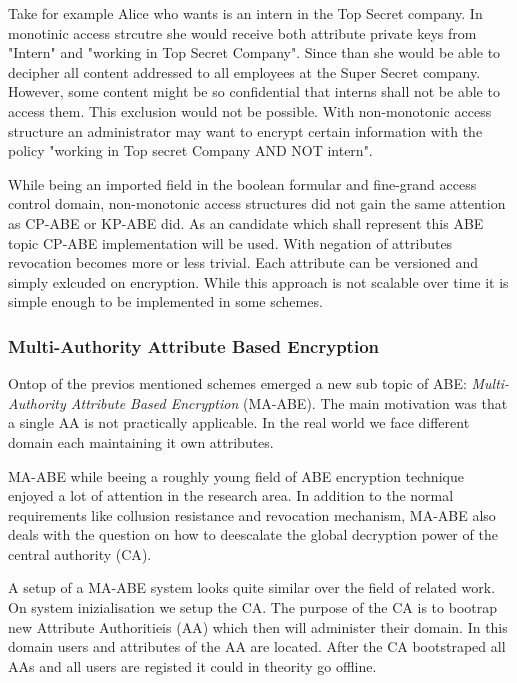 Take for example Alice who wants is an intern in the Top Secret company. In monotinic access strcutre she would receive both attribute private keys from "Intern" and "working in Top Secret Company". Since than she would be able to decipher all content addressed to all employees at the Super Secret company. However, some content might be so confidential that interns shall not be able to access them. This exclusion would not be possible. With non-monotonic access structure an administrator may want to encrypt certain information with the policy "working in Top secret Company AND NOT intern".  

While being an imported field in the boolean formular and fine-grand access control domain, non-monotonic access structures did not gain the same attention as \ac{CP-ABE} or \ac{KP-ABE} did. As an candidate which shall represent this \ac{ABE} topic \cite{10.1007/978-3-642-54631-0_16} \ac{CP-ABE} implementation will be used. With negation of attributes revocation becomes more or less trivial. Each attribute can be versioned and simply exlcuded on encryption. While this approach is not scalable over time it is simple enough to be implemented in some schemes.   

\subsubsection{Multi-Authority Attribute Based Encryption}
Ontop of the previos mentioned schemes emerged a new sub topic of \ac{ABE}: \textit{Multi-Authority Attribute Based Encryption} (\ac{MA-ABE}). The main motivation was that a single \ac{AA} is not practically applicable. In the real world we face different domain each maintaining it own attributes. 

\ac{MA-ABE} while beeing a roughly young field of \ac{ABE} encryption technique enjoyed a lot of attention in the research area. In addition to the normal requirements like collusion resistance and revocation mechanism, \ac{MA-ABE} also deals with the question on how to deescalate the global decryption power of the central authority (\ac{CA}). 

A setup of a \ac{MA-ABE} system looks quite similar over the field of related work. On system inizialisation we setup the \ac{CA}. The purpose of the \ac{CA} is to bootrap new Attribute Authoritieis (\ac{AA}) which then will administer their domain. In this domain users and attributes of the \ac{AA} are located. After the \ac{CA} bootstraped all \ac{AA}s and all users are registed it could in theority go offline. 

